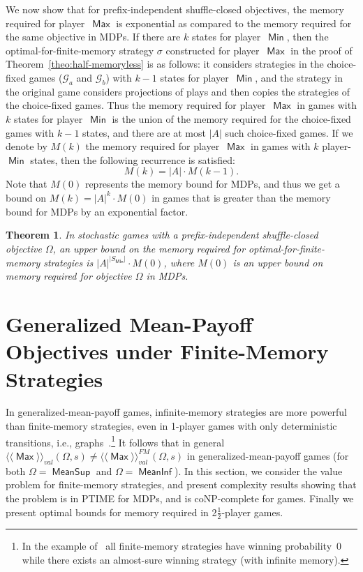 \documentclass{article}
\newtheorem{theorem}{Theorem}
\def\abs#1{\ensuremath{\lvert #1\rvert}}
\newcommand{\half}{$\frac{\text{1}}{\text{2}}$}
\newcommand{\GG}{\mathcal{G}}
\newcommand{\winval}[1]{\langle \! \langle #1 \rangle\! \rangle_{\mathit{val}} }
\newcommand{\va}{\winval{\ma}}
\newcommand{\vaf}{\winval{\ma}^{{FM}}}
\newcommand{\straa}{\sigma}
\DeclareMathOperator{\ma}{\mathsf{Max}}
\DeclareMathOperator{\mi}{\mathsf{Min}}
\newcommand{\MeanSup}{\operatorname{\mathsf{MeanSup}}}
\newcommand{\MeanInf}{\operatorname{\mathsf{MeanInf}}}
\begin{document}
\smallskip{} 
We now show that for prefix-independent shuffle-closed objectives, 
the memory required for player~$\ma$ is exponential as compared
to the memory required for the same objective in MDPs.
If there are $k$ states for player~$\mi$, then the optimal-for-finite-memory 
strategy $\straa$ constructed for player~$\ma$ in the proof of Theorem~\ref{theo:half-memoryless}
is as follows: it considers strategies in the choice-fixed games 
($\GG_a$ and $\GG_b$) with $k-1$ states for player~$\mi$, and the strategy in 
the original game considers projections of plays and then copies the strategies 
of the choice-fixed games. 
Thus the memory required for player~$\ma$ in games with $k$ states for player~$\mi$ is the union
of the memory required for the choice-fixed games with $k-1$ states, and there 
are at most $\abs{A}$ such choice-fixed games.
If we denote by $M(k)$ the memory required for player~$\ma$ in games with $k$ 
player-$\mi$ states, then the following recurrence is satisfied:
\[
M(k) = \abs{A} \cdot M(k-1). 
\]
Note that $M(0)$ represents the memory bound for MDPs, and thus we get a bound on 
$M(k)=\abs{A}^k \cdot M(0)$ in games that is greater than the 
memory bound for MDPs by an exponential factor.



\begin{theorem}\label{theo:membou}
In stochastic games with a prefix-independent shuffle-closed objective $\Omega$, 
an upper bound on the memory required for optimal-for-finite-memory strategies
is $\abs{A}^{\abs{S_{\mi}}} \cdot M(0)$, where $M(0)$ is an upper bound on memory
required for objective $\Omega$ in MDPs.
\end{theorem}



\section{Generalized Mean-Payoff Objectives under Finite-Memory Strategies}\label{sec:finmem}

In generalized-mean-payoff games, infinite-memory strategies are more powerful 
than finite-memory strategies, even in 1-player games with only deterministic 
transitions, i.e., graphs~\cite[Lemma~7]{VCDHRR15}.\footnote{In the example of~\cite[Lemma~7]{VCDHRR15}
all finite-memory strategies have winning probability~0 while there exists an almost-sure 
winning strategy (with infinite memory).}
It follows that in general $\va(\Omega, s) \neq \vaf(\Omega, s)$ in generalized-mean-payoff games
(for both $\Omega = \MeanSup$ and $\Omega = \MeanInf$).
In this section, we consider the value problem for finite-memory
strategies, and present complexity results showing that the problem is in PTIME for
MDPs, and is coNP-complete for games.
Finally we present optimal bounds for memory required in 2\half-player games.
\end{document}
